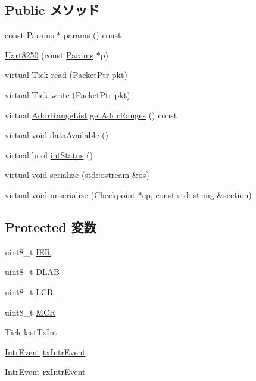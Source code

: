 \subsection*{Public メソッド}
\begin{DoxyCompactItemize}
\item 
const \hyperlink{classUart8250_aa413e69885bd7a520ee8b988aa3e1c8b}{Params} $\ast$ \hyperlink{classUart8250_acd3c3feb78ae7a8f88fe0f110a718dff}{params} () const 
\item 
\hyperlink{classUart8250_a199a0b3907670a9f201d8123ce9bbcda}{Uart8250} (const \hyperlink{classUart8250_aa413e69885bd7a520ee8b988aa3e1c8b}{Params} $\ast$p)
\item 
virtual \hyperlink{base_2types_8hh_a5c8ed81b7d238c9083e1037ba6d61643}{Tick} \hyperlink{classUart8250_a613ec7d5e1ec64f8d21fec78ae8e568e}{read} (\hyperlink{classPacket}{PacketPtr} pkt)
\item 
virtual \hyperlink{base_2types_8hh_a5c8ed81b7d238c9083e1037ba6d61643}{Tick} \hyperlink{classUart8250_a4cefab464e72b5dd42c003a0a4341802}{write} (\hyperlink{classPacket}{PacketPtr} pkt)
\item 
virtual \hyperlink{classstd_1_1list}{AddrRangeList} \hyperlink{classUart8250_a36cf113d5e5e091ebddb32306c098fae}{getAddrRanges} () const 
\item 
virtual void \hyperlink{classUart8250_a603e184f4f31471b76cff54303262aa8}{dataAvailable} ()
\item 
virtual bool \hyperlink{classUart8250_a57f9c26cb4108beccb35bb1938990932}{intStatus} ()
\item 
virtual void \hyperlink{classUart8250_ad6272f80ae37e8331e3969b3f072a801}{serialize} (std::ostream \&os)
\item 
virtual void \hyperlink{classUart8250_af22e5d6d660b97db37003ac61ac4ee49}{unserialize} (\hyperlink{classCheckpoint}{Checkpoint} $\ast$cp, const std::string \&section)
\end{DoxyCompactItemize}
\subsection*{Protected 変数}
\begin{DoxyCompactItemize}
\item 
uint8\_\-t \hyperlink{classUart8250_a0d2e65bc658b3afbf973a7d17b1a1141}{IER}
\item 
uint8\_\-t \hyperlink{classUart8250_a6f5a5913f717a1e7b5c873b039943e71}{DLAB}
\item 
uint8\_\-t \hyperlink{classUart8250_aa9c639e7ed5a83c1914831868650c332}{LCR}
\item 
uint8\_\-t \hyperlink{classUart8250_a87b7c2c55a7f4f90bfb8d7220e9ef4fd}{MCR}
\item 
\hyperlink{base_2types_8hh_a5c8ed81b7d238c9083e1037ba6d61643}{Tick} \hyperlink{classUart8250_a21681e52ffddf9836e26b311b3d66179}{lastTxInt}
\item 
\hyperlink{classUart8250_1_1IntrEvent}{IntrEvent} \hyperlink{classUart8250_a619f722020680f8c7380685b753493b8}{txIntrEvent}
\item 
\hyperlink{classUart8250_1_1IntrEvent}{IntrEvent} \hyperlink{classUart8250_a15bed45cc2f52bb7b1f571124937ef23}{rxIntrEvent}
\end{DoxyCompactItemize}


